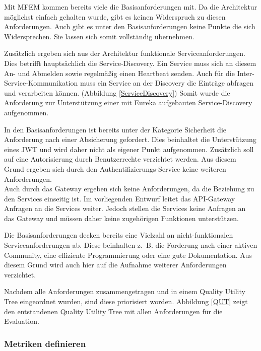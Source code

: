 Mit \ac{MFEM} kommen bereits viele die Basisanforderungen mit. Da die Architektur möglichst einfach gehalten wurde, gibt es keinen Widerspruch zu diesen Anforderungen. Auch gibt es unter den Basisanforderungen keine Punkte die sich Widersprechen. Sie lassen sich somit vollständig übernehmen.

Zusätzlich ergeben sich aus der Architektur funktionale Serviceanforderungen. Dies betrifft hauptsächlich die Service-Discovery. Ein Service muss sich an diesem An- und Abmelden sowie regelmäßig einen Heartbeat senden. Auch für die Inter-Service-Kommunikation muss ein Service an der Discovery die Einträge abfragen und verarbeiten können. (Abbildung \ref{ServiceDiscovery}) Somit wurde die Anforderung zur Unterstützung einer mit Eureka aufgebauten Service-Discovery aufgenommen.

In den Basisanforderungen ist bereits unter der Kategorie Sicherheit die Anforderung nach einer Absicherung gefordert. Dies beinhaltet die Unterstützung eines \ac{JWT} und wird daher nicht als eigener Punkt aufgenommen. Zusätzlich soll auf eine Autorisierung durch Benutzerrechte verzichtet werden. 
Aus diesem Grund ergeben sich durch den Authentifizierungs-Service keine weiteren Anforderungen.\\
Auch durch das Gateway ergeben sich keine Anforderungen, da die Beziehung zu den Services einseitig ist. Im vorliegenden Entwurf leitet das API-Gateway Anfragen an die Services weiter. Jedoch stellen die Services keine Anfragen an das Gateway und müssen daher keine zugehörigen Funktionen unterstützen.

Die Basisanforderungen decken bereits eine Vielzahl an nicht-funktionalen Serviceanforderungen ab. Diese beinhalten z.~B. die Forderung nach einer aktiven Community, eine effiziente Programmierung oder eine gute Dokumentation. Aus diesem Grund wird auch hier auf die Aufnahme weiterer Anforderungen verzichtet.

Nachdem alle Anforderungen zusammengetragen und in einem Quality Utility Tree eingeordnet wurden, sind diese priorisiert worden. Abbildung \ref{QUT} zeigt den entstandenen Quality Utility Tree mit allen Anforderungen für die Evaluation.


\subsubsection{Metriken definieren}

